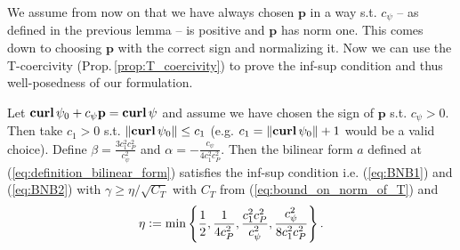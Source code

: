 \documentclass[../master_thesis.tex]{subfiles}
\begin{document}
We assume from now on that we have always chosen $\mathbf{p}$ in a way s.t. 
$c_\psi$ -- as defined in the previous lemma -- is positive and $\mathbf{p}$ has 
norm one. This comes down to choosing $\mathbf{p}$ with the correct sign and normalizing it. 
Now we can use the T-coercivity (Prop.\,\ref{prop:T_coercivity}) to prove the inf-sup condition and thus 
well-posedness of our formulation.

\begin{theorem}
    Let $\veccurl \psi_0 + c_\psi \mathbf{p} = \veccurl \psi$ and assume we have chosen the sign of 
    $\mathbf{p}$ s.t. $c_\psi > 0$. Then take $c_1 >0 $ s.t. 
    $\lVert \veccurl \psi_0 \rVert \leq c_1$ (e.g. $c_1 = \lVert \veccurl \psi_0 \rVert + 1$ would be a valid choice). Define 
    $\beta = \frac{3 c_1^2 c_P^2}{c_\psi^2}$ and $\alpha = -\frac{c_\psi}{4 c_1^2 c_P^2}$. 
    Then the bilinear form $a$ defined at (\ref{eq:definition_bilinear_form}) 
    satisfies the inf-sup condition i.e. (\ref{eq:BNB1}) and (\ref{eq:BNB2})
    with $\gamma \geq \eta/\sqrt{C_T}$ with $C_T$ from (\ref{eq:bound_on_norm_of_T})
    and 
    \begin{align*}
        \eta \vcentcolon= \min \left\{ \frac{1}{2},  \frac{1}{4 c_P^2}, \frac{c_1^2 c_P^2}{c_\psi^2},
        \frac{c_\psi^2}{8 c_1^2 c_P^2}\right\}.
    \end{align*}
\end{theorem}
\end{document}
